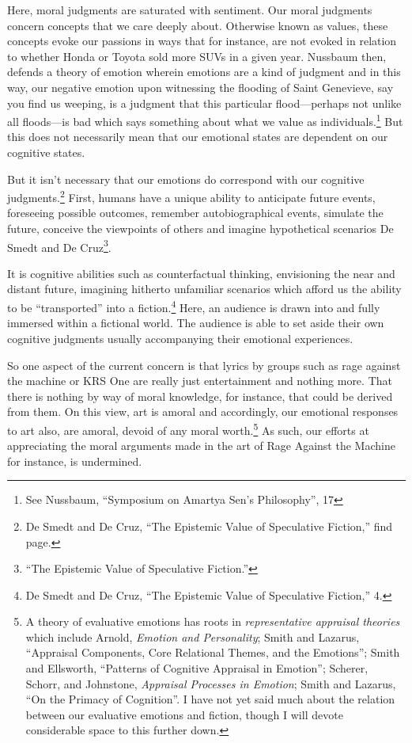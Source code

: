 \documentclass[phdthesis,12pt,final,a4paper]{wuthesis}
\theoremstyle{definition}
\theoremstyle{definition}
\theoremstyle{definition}
\theoremstyle{definition}
\theoremstyle{remark}
\begin{document}
Here, moral judgments are saturated with sentiment. Our moral judgments concern concepts that we care deeply about. Otherwise known as values, these concepts evoke our passions in ways that for instance, are not evoked in relation to whether Honda or Toyota sold more SUVs in a given year. Nussbaum then, defends a theory of emotion wherein emotions are a kind of judgment and in this way, our negative emotion upon witnessing the flooding of Saint Genevieve, say you find us weeping, is a judgment that this particular flood---perhaps not unlike all floods---is bad which says something about what we value as individuals.\footnote{See Nussbaum, {``Symposium on {Amartya Sen}'s Philosophy''}, 17} But this does not necessarily mean that our emotional states are dependent on our cognitive states.

But it isn't necessary that our emotions do correspond with our cognitive judgments.\footnote{De Smedt and De Cruz, {``The Epistemic Value of Speculative Fiction,''} find page.} First, humans have a unique ability to anticipate future events, foreseeing possible outcomes, remember autobiographical events, simulate the future, conceive the viewpoints of others and imagine hypothetical scenarios De Smedt and De Cruz\footnote{{``The Epistemic Value of Speculative Fiction.''}}.

It is cognitive abilities such as counterfactual thinking, envisioning the near and distant future, imagining hitherto unfamiliar scenarios which afford us the ability to be ``transported'' into a fiction.\footnote{De Smedt and De Cruz, {``The Epistemic Value of Speculative Fiction,''} 4.} Here, an audience is drawn into and fully immersed within a fictional world. The audience is able to set aside their own cognitive judgments usually accompanying their emotional experiences.

So one aspect of the current concern is that lyrics by groups such as rage against the machine or KRS One are really just entertainment and nothing more. That there is nothing by way of moral knowledge, for instance, that could be derived from them. On this view, art is amoral and accordingly, our emotional responses to art also, are amoral, devoid of any moral worth.\footnote{A theory of evaluative emotions has roots in \emph{representative appraisal theories} which include Arnold, \emph{Emotion and {Personality}}; Smith and Lazarus, {``Appraisal {Components}, {Core Relational Themes}, and the {Emotions}''}; Smith and Ellsworth, {``Patterns of {Cognitive Appraisal} in {Emotion}''}; Scherer, Schorr, and Johnstone, \emph{Appraisal Processes in Emotion}; Smith and Lazarus, {``On the {Primacy} of {Cognition}''}. I have not yet said much about the relation between our evaluative emotions and fiction, though I will devote considerable space to this further down.} As such, our efforts at appreciating the moral arguments made in the art of Rage Against the Machine for instance, is undermined.
\end{document}
